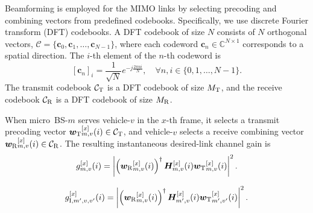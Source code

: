 \documentclass[conference, a4paper]{IEEEtran}
\newcommand{\rev}[1]{\textcolor{revisioncolor}{{}#1}}
\newif\ifshowdeletions
\newcommand{\currentdel}[1]{\ifshowdeletions\textcolor{deletioncolor}{\sout{#1}}\fi}
\theoremstyle{remark}
\begin{document}
Beamforming is employed for the MIMO links by selecting precoding and combining vectors from predefined codebooks. 
Specifically, we use discrete Fourier transform (DFT) codebooks. A DFT codebook of size $N$ consists of $N$ orthogonal vectors, $\mathcal{C} = \{\boldsymbol{c}_0, \boldsymbol{c}_1, \dots, \boldsymbol{c}_{N-1}\}$, where each codeword $\boldsymbol{c}_n \in \mathbb{C}^{N \times 1}$ corresponds to a spatial direction. The $i$-th element of the $n$-th codeword is
\begin{equation}
\label{eq:dft_codebook}
    [\boldsymbol{c}_n]_i = \frac{1}{\sqrt{N}} e^{-j \frac{2\pi ni}{N}}, \quad \forall n, i \in \{0, 1, \dots, N-1\}.
\end{equation}
The transmit codebook $\mathcal{C}_{\rm T}$ is a DFT codebook of size $M_{\rm T}$, and the receive codebook $\mathcal{C}_{\rm R}$ is a DFT codebook of size $M_{\rm R}$. 

When micro~BS-$m$ serves vehicle-$v$ in the $x$-th frame, it selects a transmit precoding vector ${\bm{w}_{\rm T}}_{m,v}^{[x]}(i) \in \mathcal{C}_{\rm T}$, and vehicle-$v$ selects a receive combining vector ${\bm{w}_{\rm R}}_{m,v}^{[x]}(i) \in \mathcal{C}_{\rm R}$. The resulting
instantaneous {desired-link} channel gain is
\begin{equation}
\label{eq:mimo_instant_gain}
    g_{m,v}^{[x]}(i) = \left| \left({\bm{w}_{\rm R}}_{m,v}^{[x]}(i)\right)^{\dagger} \boldsymbol{H}_{m,v}^{[x]}(i) {\bm{w}_{\rm T}}_{m,v}^{[x]} (i)\right|^2.
\end{equation}
\currentdel{For an interfering micro BS-$m$ that does not serve vehicle-$v$, we do not explicitly model its beam pattern toward vehicle-$v$. Instead, the corresponding interference-link channel gain is approximated by the Frobenius norm–based average gain of the MIMO channel matrix:}
\ifshowdeletions
\begin{equation*}
    \currentdel{\ensuremath{g_{{\rm I},m,v}^{[x]}(i)\triangleq
    \frac{1}{M_{\rm T}M_{\rm R}}\bigl\|\boldsymbol H_{m,v}^{[x]}(i)\bigr\|_F^2,}}
\end{equation*}
\fi
{\color{revisioncolor}
\begin{equation}
\label{eq:mimo_instant_gain_interference}
    g_{{\rm I},m',v,v'}^{[x]}(i)
    = \left|\left({\bm{w}_{\rm R}}_{m,v}^{[x]}(i)\right)^{\dagger}
    \boldsymbol{H}_{m',v}^{[x]}(i){\bm{w}_{\rm T}}_{m',v'}^{[x]}(i)\right|^2.
\end{equation}
}
\currentdel{which provides a simple approximation of the effective interference power under random transmit and receive beam directions.}
\end{document}
